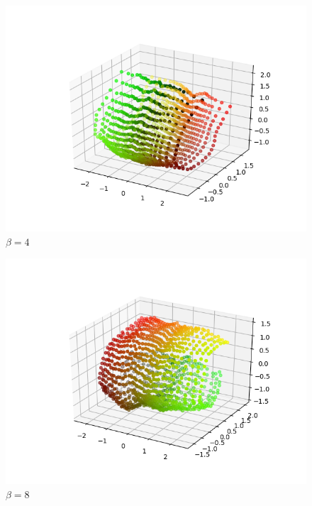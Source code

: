 \begin{figure}[h!]
\begin{center}
 
  \includegraphics[width=\linewidth]{metrics/3D-b4.png}
  \caption{$\beta=4$} \label{3D-b4}
\end{center}
\end{figure}
\begin{figure}[h!]
\begin{center}
 
  \includegraphics[width=\linewidth]{3D-beta8.png}
  \caption{$\beta=8$} \label{3D-b8}
\end{center}
\end{figure}


